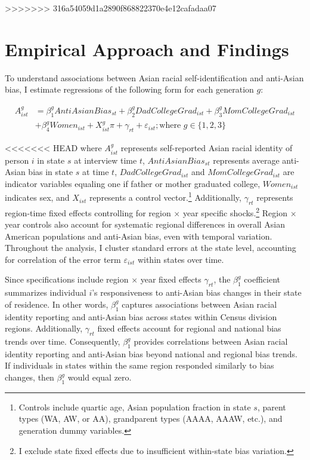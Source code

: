 >>>>>>> 316a54059d1a2890f868822370e4e12cafadaa07

\section{Empirical Approach and Findings}\label{sec:empstrat}

To understand associations between Asian racial self-identification and anti-Asian bias, I estimate regressions of the following form for each generation $g$:

\begin{align}
A_{ist}^g &= \beta_1^g AntiAsianBias_{st} + \beta_2^g DadCollegeGrad_{ist} + \beta_3^g MomCollegeGrad_{ist} \nonumber \\ 
            &+ \beta_4^g Women_{ist} + X_{ist}^g\pi + \gamma_{rt} 
           + \varepsilon_{ist}; 
           \text{where } g \in \{1,2,3\} \label{eq:identity_reg_bias}
\end{align}

<<<<<<< HEAD
where $A_{ist}^g$ represents self-reported Asian racial identity of person $i$ in state $s$ at interview time $t$, $AntiAsianBias_{st}$ represents average anti-Asian bias in state $s$ at time $t$, $DadCollegeGrad_{ist}$ and $MomCollegeGrad_{ist}$ are indicator variables equaling one if father or mother graduated college, $Women_{ist}$ indicates sex, and $X_{ist}$ represents a control vector.\footnote{Controls include quartic age, Asian population fraction in state $s$, parent types (WA, AW, or AA), grandparent types (AAAA, AAAW, etc.), and generation dummy variables.} Additionally, $\gamma_{rt}$ represents region-time fixed effects controlling for region $\times$ year specific shocks.\footnote{I exclude state fixed effects due to insufficient within-state bias variation.} Region $\times$ year controls also account for systematic regional differences in overall Asian American populations and anti-Asian bias, even with temporal variation. Throughout the analysis, I cluster standard errors at the state level, accounting for correlation of the error term $\varepsilon_{ist}$ within states over time.

Since specifications include region $\times$ year fixed effects $\gamma_{rt}$, the $\beta_1^g$ coefficient summarizes individual $i$'s responsiveness to anti-Asian bias changes in their state of residence. In other words, $\beta_1^g$ captures associations between Asian racial identity reporting and anti-Asian bias across states within Census division regions. Additionally, $\gamma_{rt}$ fixed effects account for regional and national bias trends over time. Consequently, $\beta_1^g$ provides correlations between Asian racial identity reporting and anti-Asian bias beyond national and regional bias trends. If individuals in states within the same region responded similarly to bias changes, then $\beta_1^g$ would equal zero.

